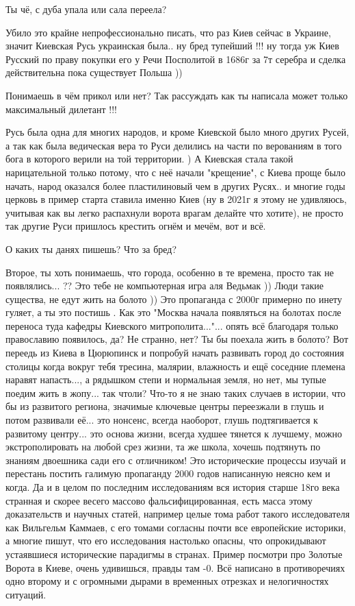 \begin{itemize}
Ты чё, с дуба упала или сала переела?

Убило это крайне непрофессионально писать, что раз Киев сейчас в Украине,
значит Киевская Русь украинская была.. ну бред тупейший !!! ну тогда уж Киев
Русский по праву покупки его у Речи Посполитой в 1686г за 7т серебра и сделка
действительна пока существует Польша ))

Понимаешь в чём прикол или нет? Так рассуждать как ты написала может только максимальный дилетант !!!

Русь была одна для многих народов, и кроме Киевской было много других Русей, а
так как была ведическая вера то Руси делились на части по верованиям в того
бога в которого верили на той территории. ) А Киевская стала такой
нарицательной только потому, что с неё начали "крещение", с Киева проще было
начать, народ оказался более пластилиновый чем в других Русях.. и многие годы
церковь в пример старта ставила именно Киев (ну в 2021г я этому не удивляюсь,
учитывая как вы легко распахнули ворота врагам делайте что хотите), не просто
так другие Руси пришлось крестить огнём и мечём, вот и всё.

О каких ты данях пишешь? Что за бред?

Второе, ты хоть понимаешь, что города, особенно в те времена, просто так не
появлялись... ?? Это тебе не компьютерная игра аля Ведьмак )) Люди такие
существа, не едут жить на болото )) Это пропаганда с 2000г примерно по инету
гуляет, а ты это постишь . Как это "Москва начала появляться на болотах после
переноса туда кафедры Киевского митрополита..."... опять всё благодаря только
православию появилось, да? Не странно, нет? Ты бы поехала жить в болото? Вот
переедь из Киева в Цюрюпинск и попробуй начать развивать город до состояния
столицы когда вокруг тебя тресина, малярии, влажность и ещё соседние племена
наравят напасть..., а рядышком степи и нормальная земля, но нет, мы тупые
поедим жить в жопу... так чтоли? Что-то я не знаю таких случаев в истории, что
бы из развитого региона, значимые ключевые центры переезжали в глушь и потом
развивали её... это нонсенс, всегда наоборот, глушь подтягивается к развитому
центру... это основа жизни, всегда худшее тянется к лучшему, можно
экстрополировать на любой срез жизни, та же школа, хочешь подтянуть по знаниям
двоешника сади его с отличником! Это исторические процессы изучай и перестань
постить галимую пропаганду 2000 годов написанную неясно кем и когда. Да и в
целом по последним исследованиям вся история старше 18го века странная и скорее
весего массово фальсифицированная, есть масса этому доказательств и научных
статей, например целые тома работ такого исследователя как Вильгельм Каммаев, с
его томами согласны почти все европейские историки, а многие пишут, что его
исследования настолько опасны, что опрокидывают устаявшиеся исторические
парадигмы в странах. Пример посмотри про Золотые Ворота в Киеве, очень
удивишься, правды там -0. Всё написано в противоречиях одно второму и с
огромными дырами в временных отрезках и нелогичностях ситуаций.


\end{itemize}
